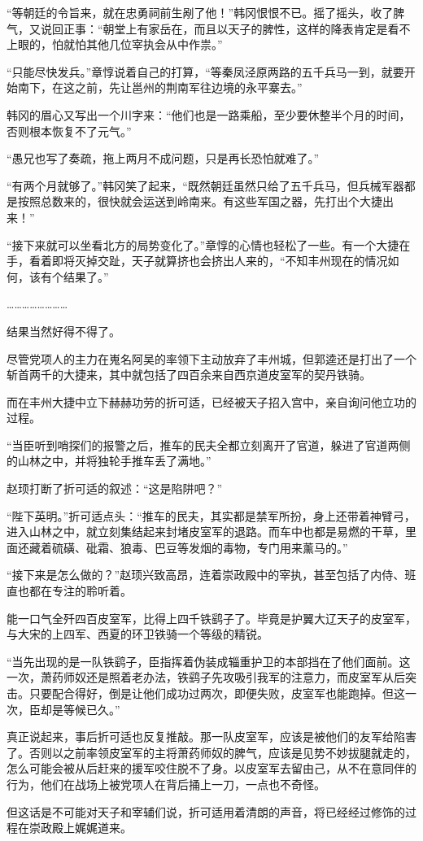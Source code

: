 “等朝廷的令旨来，就在忠勇祠前生剐了他！”韩冈恨恨不已。摇了摇头，收了脾气，又说回正事：“朝堂上有家岳在，而且以天子的脾性，这样的降表肯定是看不上眼的，怕就怕其他几位宰执会从中作祟。”

“只能尽快发兵。”章惇说着自己的打算，“等秦凤泾原两路的五千兵马一到，就要开始南下，在这之前，先让邕州的荆南军往边境的永平寨去。”

韩冈的眉心又写出一个川字来：“他们也是一路乘船，至少要休整半个月的时间，否则根本恢复不了元气。”

“愚兄也写了奏疏，拖上两月不成问题，只是再长恐怕就难了。”

“有两个月就够了。”韩冈笑了起来，“既然朝廷虽然只给了五千兵马，但兵械军器都是按照总数来的，很快就会运送到岭南来。有这些军国之器，先打出个大捷出来！”

“接下来就可以坐看北方的局势变化了。”章惇的心情也轻松了一些。有一个大捷在手，看着即将灭掉交趾，天子就算挤也会挤出人来的，“不知丰州现在的情况如何，该有个结果了。”

……………………

结果当然好得不得了。

尽管党项人的主力在嵬名阿吴的率领下主动放弃了丰州城，但郭逵还是打出了一个斩首两千的大捷来，其中就包括了四百余来自西京道皮室军的契丹铁骑。

而在丰州大捷中立下赫赫功劳的折可适，已经被天子招入宫中，亲自询问他立功的过程。

“当臣听到哨探们的报警之后，推车的民夫全都立刻离开了官道，躲进了官道两侧的山林之中，并将独轮手推车丢了满地。”

赵顼打断了折可适的叙述：“这是陷阱吧？”

“陛下英明。”折可适点头：“推车的民夫，其实都是禁军所扮，身上还带着神臂弓，进入山林之中，就立刻集结起来封堵皮室军的退路。而车中也都是易燃的干草，里面还藏着硫磺、砒霜、狼毒、巴豆等发烟的毒物，专门用来薰马的。”

“接下来是怎么做的？”赵顼兴致高昂，连着崇政殿中的宰执，甚至包括了内侍、班直也都在专注的聆听着。

能一口气全歼四百皮室军，比得上四千铁鹞子了。毕竟是护翼大辽天子的皮室军，与大宋的上四军、西夏的环卫铁骑一个等级的精锐。

“当先出现的是一队铁鹞子，臣指挥着伪装成辎重护卫的本部挡在了他们面前。这一次，萧药师奴还是照着老办法，铁鹞子先攻吸引我军的注意力，而皮室军从后突击。只要配合得好，倒是让他们成功过两次，即便失败，皮室军也能跑掉。但这一次，臣却是等候已久。”

真正说起来，事后折可适也反复推敲。那一队皮室军，应该是被他们的友军给陷害了。否则以之前率领皮室军的主将萧药师奴的脾气，应该是见势不妙拔腿就走的，怎么可能会被从后赶来的援军咬住脱不了身。以皮室军去留由己，从不在意同伴的行为，他们在战场上被党项人在背后捅上一刀，一点也不奇怪。

但这话是不可能对天子和宰辅们说，折可适用着清朗的声音，将已经经过修饰的过程在崇政殿上娓娓道来。

